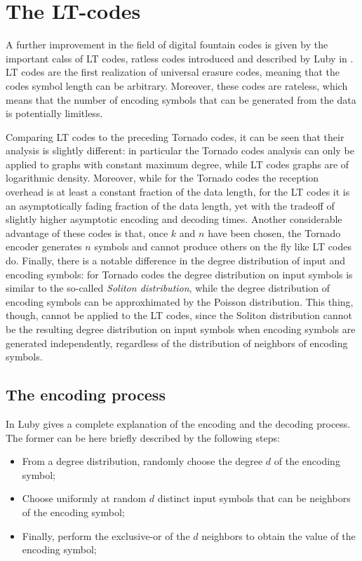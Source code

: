 \section{The LT-codes}
\label{sec:lt}
A further improvement in the field of digital fountain codes is given by the important calss of LT codes, ratless codes introduced and described by Luby in \cite{Luby}. LT codes are the first realization of universal erasure codes, meaning that the codes symbol length can be arbitrary. Moreover, these codes are rateless, which means that the number of encoding symbols that can be generated from the data is potentially limitless.

Comparing LT codes to the preceding Tornado codes, it can be seen that their analysis is slightly different: in particular the Tornado codes analysis can only be applied to graphs with constant maximum degree, while LT codes graphs are of logarithmic density. Moreover, while for the Tornado codes the reception overhead is at least a constant fraction of the data length, for the LT codes it is an asymptotically fading fraction of the data length, yet with the tradeoff of slightly higher asymptotic encoding and decoding times. Another considerable advantage of these codes is that, once $k$ and $n$ have been chosen, the Tornado encoder generates $n$ symbols and cannot produce others on the fly like LT codes do. Finally, there is a notable difference in the degree distribution of input and encoding symbols: for Tornado codes the degree distribution on input symbols is similar to the so-called \textit{Soliton distribution}, while the degree distribution of encoding symbols can be approxhimated by the Poisson distribution. This thing, though, cannot be applied to the LT codes, since the Soliton distribution cannot be the resulting degree distribution on input symbols when encoding symbols are generated independently, regardless of the distribution of neighbors of encoding symbols.
\cite{Luby}

\subsection{The encoding process}
In \cite{Luby} Luby gives a complete explanation of the encoding and the decoding process. The former can be here briefly described by the following steps:
\begin{itemize}
  \item From a degree distribution, randomly choose the degree $d$ of the encoding symbol;
  \item Choose uniformly at random $d$ distinct input symbols that can be neighbors of the encoding symbol;
  \item Finally, perform the exclusive-or of the $d$ neighbors to obtain the value of the encoding symbol;
\end{itemize}

